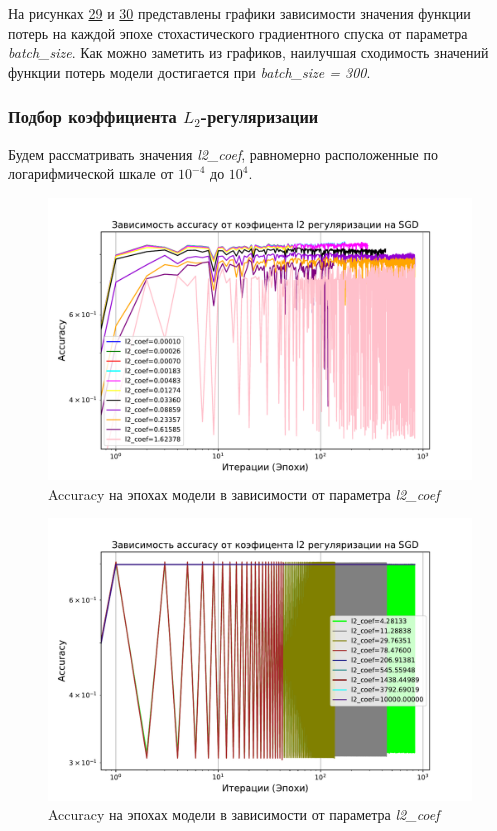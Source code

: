 \documentclass[14pt]{extarticle}
\begin{document}
На рисунках \hyperref[fig:exp_5_loss_batches_1]{29} и \hyperref[fig:exp_5_loss_beta_2]{30} представлены графики зависимости значения функции потерь на каждой эпохе стохастического градиентного спуска от параметра \textit{batch\_size}. Как можно заметить из графиков, наилучшая сходимость значений функции потерь модели достигается при \textit{batch\_size = 300}.

\subsubsection{Подбор коэффициента $L_2$-регуляризации}

Будем рассматривать значения \textit{l2\_coef}, равномерно расположенные по логарифмической шкале от $ 10^{-4} $ до $ 10^{4} $.

\begin{figure}[H]
    \centering
    \includegraphics[width=0.7\linewidth]
    {exp_5_acc_l2_1.pdf}
    \caption{Accuracy на эпохах модели в зависимости от параметра \textit{l2\_coef}}
    \label{fig:exp_5_acc_l2_1}
\end{figure}

\begin{figure}[H]
    \centering
    \includegraphics[width=0.7\linewidth]
    {exp_5_acc_l2_2.pdf}
    \caption{Accuracy на эпохах модели в зависимости от параметра \textit{l2\_coef}}
    \label{fig:exp_5_acc_l2_2}
\end{figure}
\end{document}
